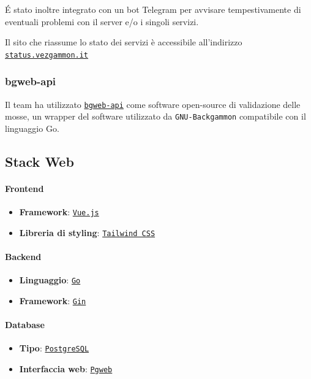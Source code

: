 \documentclass{article}
\begin{document}
\'E stato inoltre integrato con un bot Telegram per avvisare tempestivamente di eventuali problemi con il server 
e/o i singoli servizi.

Il sito che riassume lo stato dei servizi è accessibile all'indirizzo \href{https://status.vezgammon.it}{\texttt{status.vezgammon.it}}

\subsubsection{bgweb-api}
Il team ha utilizzato \href{https://github.com/foochu/bgweb-api}{\texttt{bgweb-api}} come software open-source di validazione delle mosse, 
un wrapper del software utilizzato da \texttt{GNU-Backgammon} compatibile con il linguaggio Go.

\subsection{Stack Web}

\paragraph{Frontend}
\begin{itemize}
    \item \textbf{Framework}: \href{https://github.com/vuejs/core/}{\texttt{Vue.js}}
    \item \textbf{Libreria di styling}: \href{https://github.com/tailwindlabs/tailwindcss}{\texttt{Tailwind CSS}}
\end{itemize}

\paragraph{Backend}
\begin{itemize}
    \item \textbf{Linguaggio}: \href{https://github.com/golang/go}{\texttt{Go}}
    \item \textbf{Framework}: \href{https://github.com/gin-gonic/gin}{\texttt{Gin}}
\end{itemize}

\paragraph{Database}
\begin{itemize}
    \item \textbf{Tipo}: \href{https://github.com/postgres/postgres}{\texttt{PostgreSQL}}
    \item \textbf{Interfaccia web}: \href{https://github.com/sosedoff/pgweb}{\texttt{Pgweb}}
\end{itemize}
\end{document}
